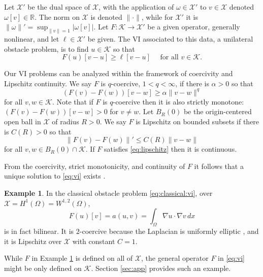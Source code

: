 \documentclass[]{interact}
\theoremstyle{plain}%
\theoremstyle{definition}
\newtheorem{example}[theorem]{Example}
\theoremstyle{remark}
\newcommand{\RR}{\mathbb{R}}
\newcommand{\grad}{\nabla}
\newcommand{\cK}{\mathcal{K}}
\newcommand{\cX}{\mathcal{X}}
\begin{document}
Let $\cX'$ be the dual space of $\cX$, with the application of $\omega \in \cX'$ to $v\in \cX$ denoted $\omega[v] \in \RR$.  The norm on $\cX$ is denoted $\|\cdot\|$, while for $\cX'$ it is $\|\omega\|' = \sup_{\|v\|=1} |\omega[v]|$.  Let $F:\cK \to \cX'$ be a given operator, generally nonlinear, and let $\ell\in \cX'$ be given.  The VI associated to this data, a unilateral obstacle problem, is to find $u\in \cK$ so that
\begin{equation} \label{eq:vi}
F(u)[v - u] \ge \ell[v - u] \quad \text{ for all } v \in \cK.
\end{equation}

Our VI problems can be analyzed within the framework of coercivity and Lipschitz continuity.  We say $F$ is $q$-coercive, $1<q<\infty$, if there is $\alpha>0$ so that
\begin{equation} \label{eq:coercive}
(F(v) - F(w))[v - w] \ge \alpha \|v-w\|^q
\end{equation}
for all $v,w \in \cK$.  Note that if $F$ is $q$-coercive then it is also strictly monotone: $(F(v) - F(w))[v - w] > 0$ for $v\ne w$.  Let $B_R(0)$ be the origin-centered open ball in $\cX$ of radius $R>0$.  We say $F$ is Lipschitz on bounded subsets if there is $C(R)>0$ so that
\begin{equation} \label{eq:lipschitz}
\|F(v)-F(w)\|' \le C(R) \|v-w\|
\end{equation}
for all $v,w \in B_R(0)\cap \cK$.  If $F$ satisfies \eqref{eq:lipschitz} then it is continuous.

From the coercivity, strict monotonicity, and continuity of $F$ it follows that a unique solution to \eqref{eq:vi} exists \cite[Corollary III.1.8]{KinderlehrerStampacchia1980}.

\begin{example}  \label{example:classicalobstacle}
In the classical obstacle problem \eqref{eq:classical:vi}, over $\cX=H^1(\Omega)=W^{1,2}(\Omega)$,
\begin{equation} \label{eq:classical:bilinearform}
F(u)[v] = a(u,v) = \int_\Omega \grad u\cdot \grad v\,dx
\end{equation}
is in fact bilinear.  It is $2$-coercive because the Laplacian is uniformly elliptic \cite{Evans2010}, and it is Lipschitz over $\cX$ with constant $C=1$.
\end{example}

While $F$ in Example \ref{example:classicalobstacle} is defined on all of $\cX$, the general operator $F$ in \eqref{eq:vi} might be only defined on $\cK$.  Section \ref{sec:app} provides such an example.
\end{document}
